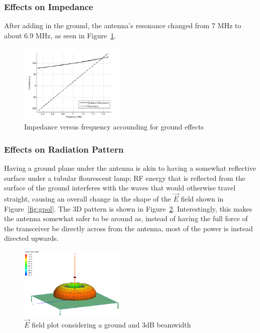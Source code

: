 \subsubsection{Effects on Impedance}
After adding in the ground, the antenna's resonance changed from 7 MHz to about
6.9 MHz, as seen in Figure~\ref{fig:gimp}.
\begin{figure}[h!]
  \centering
  \includegraphics[width=0.45\textwidth]{./img/gimpedance.png}
  \caption{Impedance versus frequency accounding for ground effects}
  \label{fig:gimp}
\end{figure}

\subsubsection{Effects on Radiation Pattern}
Having a ground plane under the antenna is akin to having a somewhat reflective
surface under a tubular flourescent lamp; RF energy that is reflected from the
surface of the ground interferes with the waves that would otherwise travel
straight, causing an overall change in the shape of the $\vec{E}$ field shown
in Figure~\ref{fig:gpol}. The 3D pattern is shown in Figure~\ref{fig:g3d}.
Interestingly, this makes the antenna somewhat safer to be around as, instead
of having the full force of the transceiver be directly across from the
antenna, most of the power is instead directed upwards.

\begin{figure}[h!]
  \centering
  \includegraphics[width=0.45\textwidth]{./img/g3dgain.png}
  \caption{$\vec{E}$ field plot considering a ground and 3dB beamwidth}
  \label{fig:g3d}
\end{figure}
